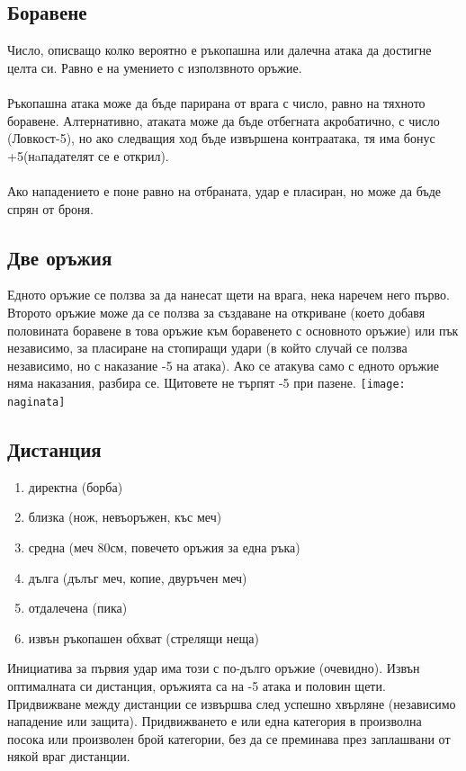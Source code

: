 \begin{multicols}{2}
\subsection{Боравене}
Число, описващо колко вероятно е ръкопашна или далечна атака да достигне целта си.
Равно е на умението с използвното оръжие.
\\
\\
Ръкопашна атака може да бъде парирана от врага с число, равно на тяхното боравене.
Алтернативно, атаката може да бъде отбегната акробатично, с число (Ловкост-5), но ако следващия ход бъде извършена контраатака, тя има бонус +5(нaпадателят се е открил).
\\
\\
Ако нападението е поне равно на отбраната, удар е пласиран, но може да бъде спрян от броня.


\subsection{Две оръжия}
Едното оръжие се ползва за да нанесат щети на врага, нека наречем него първо.
Второто оръжие може да се ползва за създаване на откриване (което добавя половината боравене в това оръжие към боравенето с основното оръжие) или пък независимо, за пласиране на стопиращи удари (в който случай се ползва независимо, но с наказание -5 на атака).
Ако се атакува само с едното оръжие няма наказания, разбира се.
Щитовете не търпят -5 при пазене.
\texttt{[image: naginata]}~


\subsection{Дистанция}
\begin{enumerate}
\item{директна (борба)}
\item{близка (нож, невъоръжен, къс меч)}
\item{средна (меч 80см, повечето оръжия за една ръка)}
\item{дълга (дълъг меч, копие, двуръчен меч)}
\item{отдалечена (пика)}
\item{извън ръкопашен обхват (стрелящи неща)}
\end{enumerate}
Инициатива за първия удар има този с по-дълго оръжие (очевидно).
Извън оптималната си дистанция, оръжията са на -5 атака и половин щети.
Придвижване между дистанции се извършва след успешно хвърляне (независимо нападение или защита).
Придвижването е или една категория в произволна посока или произволен брой категории, без да се преминава през заплашвани от някой враг дистанции.
\\



\end{multicols}

